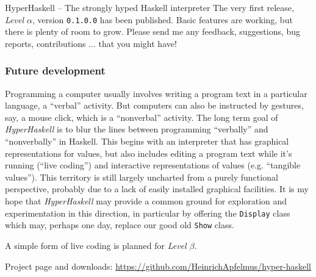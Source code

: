 \begin{hcarentry}[new]{HyperHaskell -- The strongly hyped Haskell interpreter}
The very first release, \emph{Level $\alpha$}, version \verb`0.1.0.0` has been published. Basic features are working, but there is  plenty of room to grow. Please send me any feedback, suggestions, bug reports, contributions ... that you might have!

\subsubsection*{Future development}

Programming a computer usually involves writing a program text in a particular language, a ``verbal'' activity. But computers can also be instructed by gestures, say, a mouse click, which is a ``nonverbal'' activity. The long term goal of \emph{HyperHaskell} is to blur the lines between programming ``verbally'' and ``nonverbally'' in Haskell. This begins with an interpreter that has graphical representations for values, but also includes editing a program text while it's running (``live coding'') and interactive representations of values (e.g. ``tangible values''). This territory is still largely uncharted from a purely functional perspective, probably due to a lack of easily installed graphical facilities. It is my hope that \emph{HyperHaskell} may provide a common ground for exploration and experimentation in this direction, in particular by offering the \verb!Display! class which may, perhaps one day, replace our good old \verb!Show! class.

A simple form of live coding is planned for \emph{Level $\beta$}.

\FurtherReading
\begin{compactitem}
\item Project page and downloads: \url{https://github.com/HeinrichApfelmus/hyper-haskell}
\end{compactitem}
\end{hcarentry}
